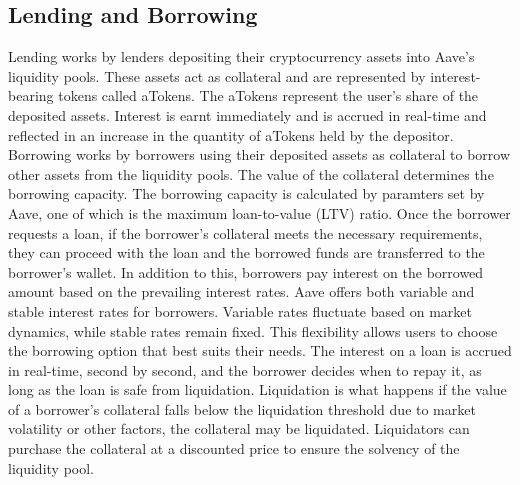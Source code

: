 \subsection{Lending and Borrowing}
Lending works by lenders depositing their cryptocurrency assets into Aave's liquidity pools. These assets act as collateral and are represented by interest-bearing tokens called aTokens. The aTokens represent the user's share of the deposited assets. Interest is earnt immediately and is accrued in real-time and reflected in an increase in the quantity of aTokens held by the depositor.
\\[5mm]
Borrowing works by borrowers using their deposited assets as collateral to borrow other assets from the liquidity pools. The value of the collateral determines the borrowing capacity. The borrowing capacity is calculated by paramters set by Aave, one of which is the maximum loan-to-value (LTV) ratio. Once the borrower requests a loan, if the borrower's collateral meets the necessary requirements, they can proceed with the loan and the borrowed funds are transferred to the borrower's wallet. In addition to this, borrowers pay interest on the borrowed amount based on the prevailing interest rates. Aave offers both variable and stable interest rates for borrowers. Variable rates fluctuate based on market dynamics, while stable rates remain fixed. This flexibility allows users to choose the borrowing option that best suits their needs. The interest on a loan is accrued in real-time, second by second, and the borrower decides when to repay it, as long as the loan is safe from liquidation. Liquidation is what happens if the value of a borrower's collateral falls below the liquidation threshold due to market volatility or other factors, the collateral may be liquidated. Liquidators can purchase the collateral at a discounted price to ensure the solvency of the liquidity pool.
